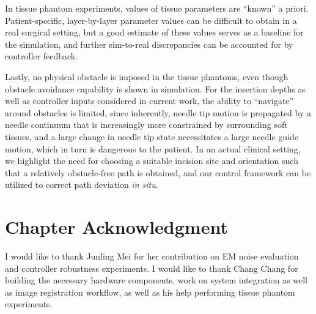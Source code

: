 In tissue phantom experiments, values of tissue parameters are ``known'' a priori. Patient-specific, layer-by-layer parameter values can be difficult to obtain in a real surgical setting, but a good estimate of these values serves as a baseline for the simulation, and further sim-to-real discrepancies can be accounted for by controller feedback.

Lastly, no physical obstacle is imposed in the tissue phantoms, even though obstacle avoidance capability is shown in simulation. For the insertion depths as well as controller inputs considered in current work, the ability to ``navigate'' around obstacles is limited, since inherently, needle tip motion is propagated by a needle continuum that is increasingly more constrained by surrounding soft tissues, and a large change in needle tip state necessitates a large needle guide motion, which in turn is dangerous to the patient. In an actual clinical setting, we highlight the need for choosing a suitable incision site and orientation such that a relatively obstacle-free path is obtained, and our control framework can be utilized to correct path deviation \textit{in situ}.

\section{Chapter Acknowledgment}
\label{sec:chap-5-ack}

I would like to thank Junling Mei for her contribution on EM noise evaluation and controller robustness experiments. I would like to thank Chang Chang for building the necessary hardware components, work on system integration as well as image registration workflow, as well as his help performing tissue phantom experiments.

